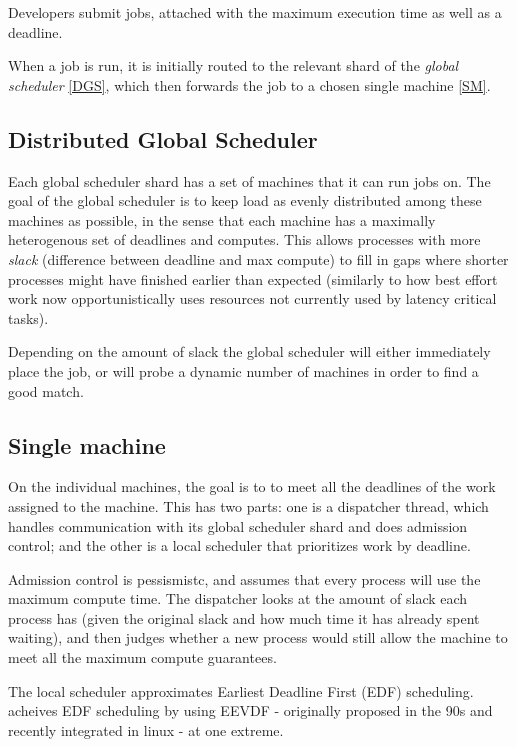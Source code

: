 Developers submit jobs, attached with the maximum execution time as well as a
deadline. 

When a job is run, it is initially routed to the relevant shard of the
\textit{global scheduler} \ref{DGS}, which then forwards the job to a chosen
single machine \ref{SM}. 


\subsection*{Distributed Global Scheduler}
\label{DGS}

Each global scheduler shard has a set of machines that it can run jobs on. The
goal of the global scheduler is to keep load as evenly distributed among these
machines as possible, in the sense that each machine has a maximally
heterogenous set of deadlines and computes. This allows processes with more
\textit{slack} (difference between deadline and max compute) to fill in gaps
where shorter processes might have finished earlier than expected (similarly to
how best effort work now opportunistically uses resources not currently used by
latency critical tasks).

Depending on the amount of slack the global scheduler will either immediately
place the job, or will probe a dynamic number of machines in order to find a
good match.


\subsection*{Single machine}
\label{SM}

On the individual machines, the goal is to to meet all the deadlines of the work
assigned to the machine. This has two parts: one is a dispatcher thread, which
handles communication with its global scheduler shard and does admission
control; and the other is a local scheduler that prioritizes work by deadline.

Admission control is pessismistc, and assumes that every process will use the
maximum compute time. The dispatcher looks at the amount of slack each process
has (given the original slack and how much time it has already spent waiting),
and then judges whether a new process would still allow the machine to meet all
the maximum compute guarantees.


The local scheduler approximates Earliest Deadline First (EDF) scheduling.
\sysname{} acheives EDF scheduling by using EEVDF - originally proposed in the 90s
and recently integrated in linux - at one extreme.

